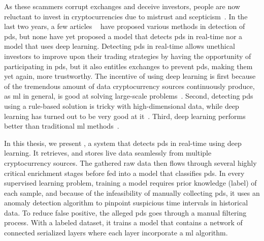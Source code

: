 As these scammers corrupt exchanges and deceive investors, people are now reluctant to invest in cryptocurrencies due to mistrust and scepticism~\cite{anchor}. In the last two years, a few articles ~\cite{P&D_to_the_moon, P&D_anatomy, P&D_scheme, P&D_pumping} have proposed various methods in detection of \acp{pd}, but none have yet proposed a model that detects \acp{pd} in real-time nor a model that uses deep learning. Detecting \acp{pd} in real-time allows unethical investors to improve upon their trading strategies by having the opportunity of participating in \acp{pd}, but it also entitles exchanges to prevent \acp{pd}, making them yet again, more trustworthy. The incentive of using deep learning is first because of the tremendous amount of data cryptocurrency sources continuously produce, as \ac{ml} in general, is good at solving large-scale problems~\cite{aws}. Second, detecting \acp{pd} using a rule-based solution is tricky with high-dimensional data, while deep learning has turned out to be very good at it~\cite{lecun2015deep}. Third, deep learning performs better than traditional \ac{ml} methods~\cite{dl_intrusion, peng2015multi}. 

In this thesis, we present \project, a system that detects \acp{pd} in real-time using deep learning. It retrieves, and stores live data seamlessly from multiple cryptocurrency sources. The gathered raw data then flows through several highly critical enrichment stages before fed into a model that classifies \acp{pd}. In every supervised learning problem, training a model requires prior knowledge (label) of each sample, and because of the infeasibility of manually collecting \acp{pd}, it uses an anomaly detection algorithm to pinpoint suspicious time intervals in historical data. To reduce false positive, the alleged \acp{pd} goes through a manual filtering process. With a labeled dataset, it trains a model that contains a network of connected serialized layers where each layer incorporate a \ac{ml} algorithm.



